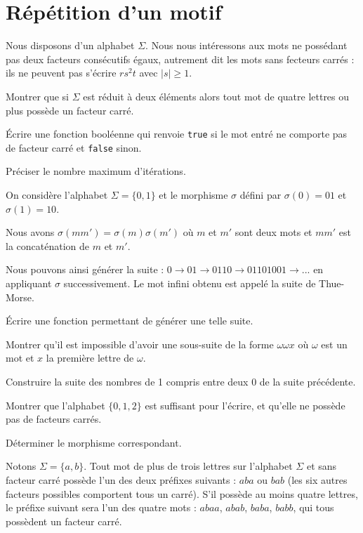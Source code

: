 \renewcommand{\SourceFile}{2-jouer-avec-les-mots/src/2-8.ml}

\section{Répétition d'un motif}

Nous disposons d'un alphabet $\Sigma$. Nous nous intéressons aux mots ne possédant pas deux facteurs consécutifs égaux, autrement dit les mots sans fecteurs carrés : ils ne peuvent pas s'écrire $rs^2t$ avec $|s|\geq1$.

\Q
Montrer que si $\Sigma$ est réduit à deux éléments alors tout mot de quatre lettres ou plus possède un facteur carré.

\Q
Écrire une fonction booléenne qui renvoie \texttt{true} si le mot entré ne comporte pas de facteur carré et \texttt{false} sinon.
\smallskip

Préciser le nombre maximum d'itérations.

\Q
On considère l'alphabet $\Sigma=\{0,1\}$ et le morphisme $\sigma$ défini par $\sigma(0) = 01$ et $\sigma(1) = 10$.
\vspace{-12pt}
\smallskip

Nous avons $\sigma(mm')=\sigma(m)\sigma(m')$ où $m$ et $m'$ sont deux mots et $mm'$ est la concaténation de $m$ et $m'$.
\smallskip

Nous pouvons ainsi générer la suite : $0 \rightarrow 01 \rightarrow 0110 \rightarrow 01101001 \rightarrow ...$ en appliquant $\sigma$ successivement. Le mot infini obtenu est appelé la suite de Thue-Morse.
\medskip

Écrire une fonction permettant de générer une telle suite.
\medskip

Montrer qu'il est impossible d'avoir une sous-suite de la forme $\omega\omega x$ où $\omega$ est un mot et $x$ la première lettre de $\omega$.

\Q
Construire la suite des nombres de 1 compris entre deux 0 de la suite précédente.
\medskip

Montrer que l'alphabet $\{0,1,2\}$ est suffisant pour l'écrire, et qu'elle ne possède pas de facteurs carrés.
\medskip

Déterminer le morphisme correspondant.

\Corrige

\Q
Notons $\Sigma=\{a,b\}$. Tout mot de plus de trois lettres sur l'alphabet $\Sigma$ et sans facteur carré possède l'un des deux préfixes suivants : $aba$ ou $bab$ (les six autres facteurs possibles comportent tous un carré). S'il possède au moins quatre lettres, le préfixe suivant sera l'un des quatre mots : $abaa$, $abab$, $baba$, $babb$, qui tous possèdent un facteur carré.

